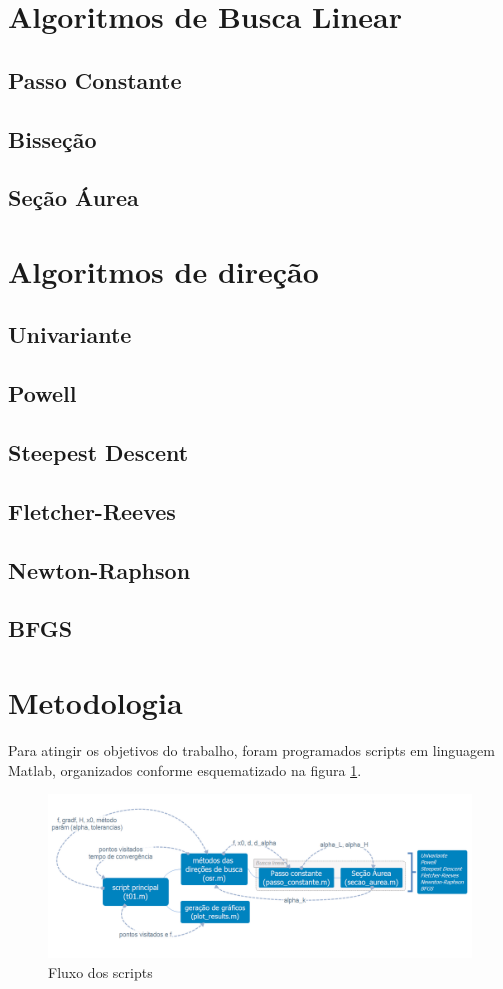 \documentclass[10pt, a4paper]{article}
\begin{document}
\section{Algoritmos de Busca Linear}
\subsection{Passo Constante}
\subsection{Bisse\c c\~ao}
\subsection{Se\c c\~ao \'Aurea}
\section{Algoritmos de dire\c c\~ao}
\subsection{Univariante}
\subsection{Powell}
\subsection{Steepest Descent}
\subsection{Fletcher-Reeves}
\subsection{Newton-Raphson}
\subsection{BFGS}

\section{Metodologia}

Para atingir os objetivos do trabalho, foram programados scripts em linguagem Matlab, organizados conforme esquematizado na figura \ref{fig:fluxo}.

\begin{figure}[H]
      \centering
      \includegraphics[width=.9\textwidth]{t01.png}
      \caption{Fluxo dos scripts}
      \label{fig:fluxo}
\end{figure}
\end{document}
